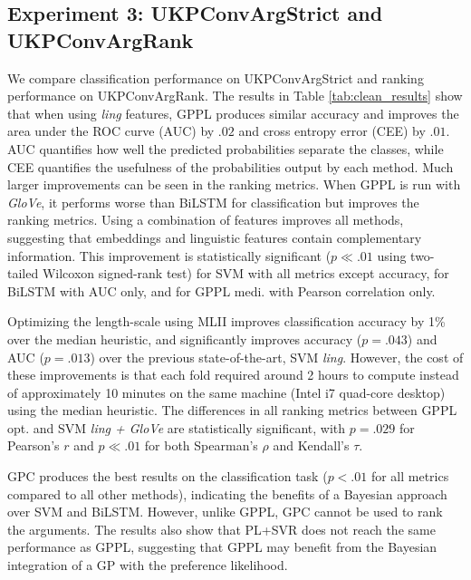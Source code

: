 \subsection{Experiment 3: UKPConvArgStrict and UKPConvArgRank}
% 
% 
%
We compare classification performance on UKPConvArgStrict  
and ranking performance on UKPConvArgRank. 
The results in Table \ref{tab:clean_results} show that when using \emph{ling} features,
GPPL produces similar accuracy and improves the area under the ROC curve (AUC) by $.02$ and cross entropy error (CEE) by $.01$.
AUC quantifies how well the predicted probabilities separate the classes,
while CEE quantifies the usefulness of the probabilities output by each method.
Much larger improvements can be seen in the ranking metrics. 
When GPPL is run with \emph{GloVe}, it performs worse than
BiLSTM for classification but improves the ranking metrics. 
Using a combination of features improves all methods, suggesting that embeddings and linguistic features contain complementary information. This improvement is statistically significant ($p \ll .01$ using two-tailed Wilcoxon signed-rank test) for SVM with all metrics except accuracy, for BiLSTM with AUC only, and for GPPL medi. with Pearson correlation only.

Optimizing the length-scale using MLII improves classification accuracy by 1\% over the median heuristic,
and significantly improves accuracy ($p=.043$) and AUC ($p=.013$) 
over the previous state-of-the-art, SVM \emph{ling}.
However, the cost of these improvements is that each fold required around 2 hours to compute instead of 
approximately 10 minutes on the same machine (Intel i7 quad-core desktop) using the median heuristic. 
The differences in all ranking metrics between GPPL opt. and SVM \emph{ling + GloVe} 
are statistically significant, with $p=.029$ for Pearson's $r$ and $p\ll.01$ for both 
Spearman's $\rho$ and Kendall's $\tau$.

GPC produces the best results on the classification task ($p<.01$ for all metrics compared to all other methods), 
indicating the benefits of a Bayesian approach over SVM and BiLSTM.
However, unlike GPPL, GPC cannot be used to rank the arguments.
The results also show that PL+SVR does not reach the same performance as GPPL, 
suggesting that GPPL may benefit from the Bayesian integration of a GP with the preference likelihood. 

